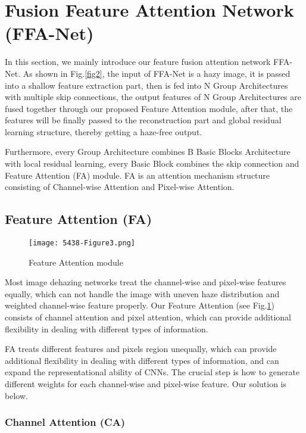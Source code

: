 \documentclass[letterpaper]{article} \usepackage{aaai20}  \usepackage{times}  \usepackage{helvet} \usepackage{courier}  \usepackage[hyphens]{url}  \usepackage{graphicx} \urlstyle{rm} \def\UrlFont{\rm}  \usepackage{graphicx}  \frenchspacing  \setlength{\pdfpagewidth}{8.5in}  \setlength{\pdfpageheight}{11in}  \usepackage{bm}
\begin{document}
\section{Fusion Feature Attention Network (FFA-Net) }
In this section, we mainly introduce our feature fusion attention network FFA-Net.  As shown in Fig.\ref{fig2},  the input of FFA-Net is a hazy image, it is passed  into a shallow feature extraction part,  then is fed  into N  Group Architectures  with multiple skip connections, the output features of N Group Architectures are fused together through our proposed Feature Attention module,  after that, the features  will be finally passed to the reconstruction part and global residual learning structure, thereby getting a haze-free output. 

Furthermore, every Group Architecture combines B Basic Blocks Architecture with local residual learning,  every Basic Block combines the skip connection and Feature Attention (FA) module.  FA is an  attention mechanism structure consisting of Channel-wise Attention and Pixel-wise Attention.

\subsection{Feature Attention (FA)}  		  
\begin{figure}[t]
	\centering
	\texttt{[image: 5438-Figure3.png]} \caption{ Feature Attention module}
	\label{fig3}
\end{figure}

Most image dehazing networks treat the channel-wise and pixel-wise features equally, which can not handle the image with uneven haze distribution  and weighted channel-wise feature properly. Our Feature Attention (see Fig.\ref{fig3}) consists of channel attention and pixel attention, which can provide additional flexibility in dealing with different types of information. 

FA treats different features and pixels region unequally, which can provide additional flexibility in dealing with different types 
of information, and can expand the representational ability of CNNs. 
The crucial step is how to generate different weights for each channel-wise and pixel-wise feature. Our solution is below.

\subsubsection{Channel Attention (CA)}
\end{document}
